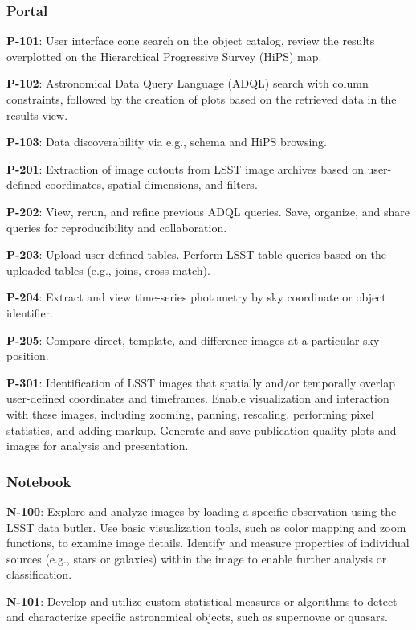 
\subsubsection{Portal}

\textbf{P-101}: User interface cone search on the object catalog, review the results overplotted on the Hierarchical Progressive Survey (HiPS) map.

\textbf{P-102}: Astronomical Data Query Language (ADQL) search with column constraints, followed by the creation of plots based on the retrieved data in the results view.

\textbf{P-103}: Data discoverability via e.g., schema and HiPS browsing. 

\textbf{P-201}: Extraction of image cutouts from LSST image archives based on user-defined coordinates, spatial dimensions, and filters.

\textbf{P-202}:  View, rerun, and refine previous ADQL queries. Save, organize, and share queries for reproducibility and collaboration.

\textbf{P-203}: Upload user-defined tables. Perform LSST table queries based on the uploaded tables (e.g., joins, cross-match).

\textbf{P-204}: Extract and view time-series photometry by sky coordinate or object identifier.

\textbf{P-205}: Compare direct, template, and difference images at a particular sky position.

\textbf{P-301}: Identification of LSST images that spatially and/or temporally overlap user-defined coordinates and timeframes. Enable visualization and interaction with these images, including zooming, panning, rescaling, performing pixel statistics, and adding markup. Generate and save publication-quality plots and images for analysis and presentation.

\subsubsection{Notebook}

\textbf{N-100}: Explore and analyze images by loading a specific observation using the LSST data butler. Use basic visualization tools, such as color mapping and zoom functions, to examine image details. Identify and measure properties of individual sources (e.g., stars or galaxies) within the image to enable further analysis or classification.

\textbf{N-101}: Develop and utilize custom statistical measures or algorithms to detect and characterize specific astronomical objects, such as supernovae or quasars.

